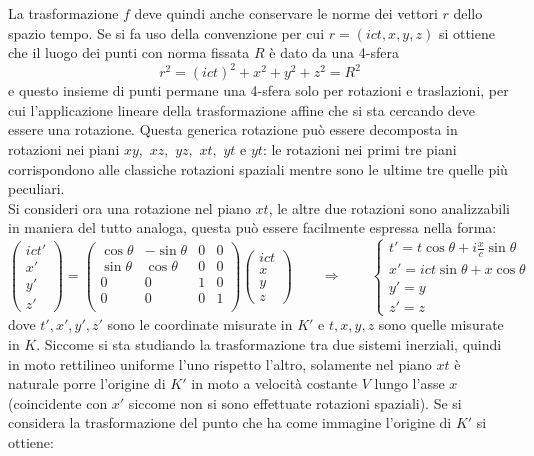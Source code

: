 La trasformazione $f$ deve quindi anche conservare le norme dei vettori $r$ dello spazio tempo. Se si fa uso della convenzione per cui $r=(ict,x,y,z)$ si ottiene che il luogo dei punti con norma fissata $R$ è dato da una 4-sfera
\begin{equation}
    r^2=(ict)^2+x^2+y^2+z^2=R^2
    \label{4-sfera}
\end{equation} 
e questo insieme di punti permane una 4-sfera solo per rotazioni e traslazioni, per cui l'applicazione lineare della trasformazione affine che si sta cercando deve essere una rotazione. Questa generica rotazione può essere decomposta in rotazioni nei piani $xy,$ $xz,$ $yz,$ $xt,$ $yt$ e $yt$: le rotazioni nei primi tre piani corrispondono alle classiche rotazioni spaziali mentre sono le ultime tre quelle più peculiari.\\ Si consideri ora una rotazione nel piano $xt$, le altre due rotazioni sono analizzabili in maniera del tutto analoga, questa può essere facilmente espressa nella forma:
\begin{equation*}
   \begin{pmatrix}
    ict'\\x'\\y'\\z'
   \end{pmatrix}
   =\begin{pmatrix}
    \cos\theta & -\sin\theta & 0 & 0\\
    \sin\theta & \cos\theta & 0 & 0\\
    0& 0 & 1 & 0\\
    0& 0 & 0 & 1\\
   \end{pmatrix}
   \begin{pmatrix}
    ict\\x\\y\\z
   \end{pmatrix}\qquad
   \Rightarrow \qquad
   \begin{cases}
    t'=t\cos\theta+i\frac{x}{c}\sin\theta\\
    x'=ict\sin\theta+x\cos\theta\\
    y'=y\\
    z'=z
   \end{cases}
\end{equation*}
dove $t',x',y',z'$ sono le coordinate misurate in $K'$ e $t,x,y,z$ sono quelle misurate in $K$. Siccome si sta studiando la trasformazione tra due sistemi inerziali, quindi in moto rettilineo uniforme l'uno rispetto l'altro, solamente nel piano $xt$ è naturale porre l'origine di $K'$ in moto a velocità costante $V$ lungo l'asse $x$ (coincidente con $x'$ siccome non si sono effettuate rotazioni spaziali). Se si considera la trasformazione del punto che ha come immagine l'origine di $K'$ si ottiene:
